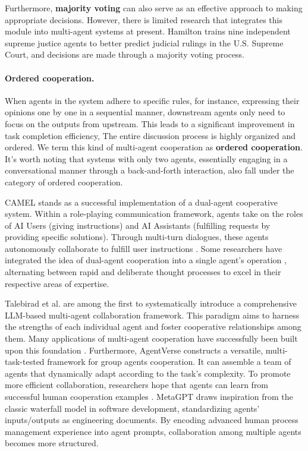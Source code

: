 Furthermore, \textbf{majority voting} can also serve as an effective approach to making appropriate decisions. However, there is limited research that integrates this module into multi-agent systems at present. Hamilton \cite{DBLP:journals/corr/abs-2301-05327} trains nine independent supreme justice agents to better predict judicial rulings in the U.S. Supreme Court, and decisions are made through a majority voting process.

\paragraph{Ordered cooperation.}
When agents in the system adhere to specific rules, for instance, expressing their opinions one by one in a sequential manner, downstream agents only need to focus on the outputs from upstream. This leads to a significant improvement in task completion efficiency, The entire discussion process is highly organized and ordered. We term this kind of multi-agent cooperation as \textbf{ordered cooperation}. It's worth noting that systems with only two agents, essentially engaging in a conversational manner through a back-and-forth interaction, also fall under the category of ordered cooperation.

CAMEL \cite{DBLP:journals/corr/abs-2303-17760} stands as a successful implementation of a dual-agent cooperative system. Within a role-playing communication framework, agents take on the roles of AI Users (giving instructions) and AI Assistants (fulfilling requests by providing specific solutions). Through multi-turn dialogues, these agents autonomously collaborate to fulfill user instructions \cite{DBLP:journals/corr/abs-2303-17071}. Some researchers have integrated the idea of dual-agent cooperation into a single agent's operation \cite{DBLP:journals/corr/abs-2305-17390}, alternating between rapid and deliberate thought processes to excel in their respective areas of expertise.

Talebirad et al. \cite{DBLP:journals/corr/abs-2306-03314} are among the first to systematically introduce a comprehensive LLM-based multi-agent collaboration framework.  This paradigm aims to harness the strengths of each individual agent and foster cooperative relationships among them. Many applications of multi-agent cooperation have successfully been built upon this foundation \cite{DBLP:journals/corr/abs-2305-16960,DBLP:journals/corr/abs-2308-08155,DBLP:journals/corr/abs-2308-11339,DBLP:journals/corr/abs-2305-13657}. Furthermore, AgentVerse \cite{DBLP:journals/corr/abs-2308-10848} constructs a versatile, multi-task-tested framework for group agents cooperation. It can assemble a team of agents that dynamically adapt according to the task's complexity. To promote more efficient collaboration, researchers hope that agents can learn from successful human cooperation examples \cite{DBLP:journals/corr/abs-2307-07924}. MetaGPT \cite{DBLP:journals/corr/abs-2308-00352} draws inspiration from the classic waterfall model in software development, standardizing agents' inputs/outputs as engineering documents. By encoding advanced human process management experience into agent prompts, collaboration among multiple agents becomes more structured.

